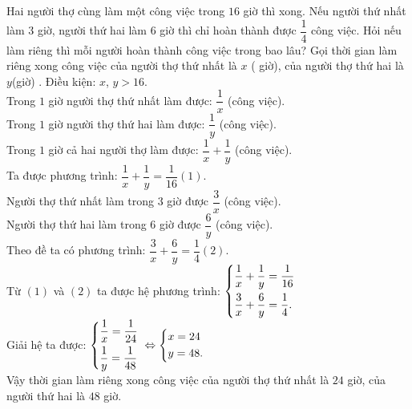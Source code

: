 \begin{ex}%
Hai người thợ cùng làm một công việc trong $16$ giờ thì xong. Nếu người thứ nhất làm $3$ giờ, người thứ hai làm $6$ giờ thì chỉ hoàn thành được $\dfrac{1}{4}$ công việc. Hỏi nếu làm riêng thì mỗi người hoàn thành công việc trong bao lâu?
\loigiai
    {
Gọi thời gian làm riêng xong công việc của người thợ thứ nhất là $x$ ( giờ), của người thợ thứ hai là
$y $(giờ) . Điều kiện: $x$, $y >16$.\\
Trong $1$ giờ người thợ thứ nhất làm được: $\dfrac{1}{x}$ (công việc).\\
Trong $1$ giờ người thợ thứ hai làm được: $\dfrac{1}{y}$ (công việc).\\
Trong $1$ giờ cả hai người thợ làm được: $\dfrac{1}{x}+\dfrac{1}{y}$ (công việc).\\
Ta được phương trình: $\dfrac{1}{x}+\dfrac{1}{y}=\dfrac{1}{16}  (1).$\\
Người thợ thứ nhất làm trong $3$ giờ được $\dfrac{3}{x}$ (công việc).\\
Người thợ thứ hai làm trong $6$ giờ được $\dfrac{6}{y}$ (công việc).\\
Theo đề ta có phương trình: $\dfrac{3}{x}+\dfrac{6}{y}=\dfrac{1}{4}  (2).$\\
Từ $(1)$ và $(2)$ ta được hệ phương trình: $\left\{\begin{aligned}&\dfrac{1}{x}+\dfrac{1}{y}=\dfrac{1}{16}\\&\dfrac{3}{x}+\dfrac{6}{y}=\dfrac{1}{4}.\end{aligned}\right.$\\
Giải hệ ta được: $\left\{\begin{aligned}&\dfrac{1}{x}=\dfrac{1}{24}\\&\dfrac{1}{y}=\dfrac{1}{48}\end{aligned}\right.$ $\Leftrightarrow \left\{\begin{aligned}&x=24\\&y=48.\end{aligned}\right.$\\
Vậy thời gian làm riêng xong công việc của người thợ thứ nhất là $24$ giờ, của người thứ hai là $48$ giờ.
	}
\end{ex}


